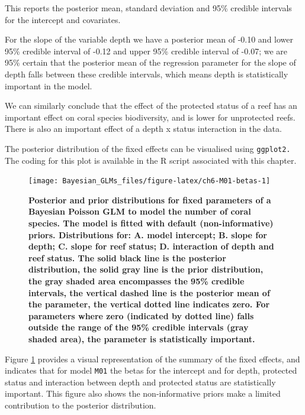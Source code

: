 \documentclass[
]{book}
\begin{document}
This reports the posterior mean, standard deviation and 95\% credible intervals for the intercept and covariates.

For the slope of the variable depth we have a posterior mean of -0.10 and lower 95\% credible interval of -0.12 and upper 95\% credible interval of -0.07; we are 95\% certain that the posterior mean of the regression parameter for the slope of depth falls between these credible intervals, which means depth is statistically important in the model.

We can similarly conclude that the effect of the protected status of a reef has an important effect on coral species biodiversity, and is lower for unprotected reefs. There is also an important effect of a depth x status interaction in the data.

The posterior distribution of the fixed effects can be visualised using \texttt{ggplot2.} The coding for this plot is available in the R script associated with this chapter.



\begin{figure}

{\centering \texttt{[image: Bayesian\_GLMs\_files/figure-latex/ch6-M01-betas-1]} 

}

\caption{\textbf{Posterior and prior distributions for fixed parameters of a Bayesian Poisson GLM to model the number of coral species. The model is fitted with default (non-informative) priors. Distributions for: A. model intercept; B. slope for depth; C. slope for reef status; D. interaction of depth and reef status. The solid black line is the posterior distribution, the solid gray line is the prior distribution, the gray shaded area encompasses the 95\% credible intervals, the vertical dashed line is the posterior mean of the parameter, the vertical dotted line indicates zero. For parameters where zero (indicated by dotted line) falls outside the range of the 95\% credible intervals (gray shaded area), the parameter is statistically important.}}\label{fig:ch6-M01-betas}
\end{figure}

Figure \ref{fig:ch6-M01-betas} provides a visual representation of the summary of the fixed effects, and indicates that for model \texttt{M01} the betas for the intercept and for depth, protected status and interaction between depth and protected status are statistically important. This figure also shows the non-informative priors make a limited contribution to the posterior distribution.
\end{document}

